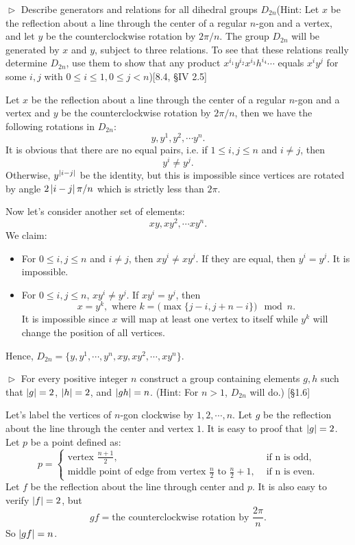 \hypertarget{Exercise II.2.5}{}
\begin{problem}[2.5]
 $\vartriangleright$ Describe generators and relations for all dihedral groups $D_{2n}$(Hint: Let $x$ be the reflection about a line through the 
 center of a regular $n$-gon and a vertex, and let $y$ be the counterclockwise rotation by $2\pi/n$. The group $D_{2n}$ will
 be generated by $x$ and $y$, subject to three relations. To see that these relations really determine $D_{2n}$, use them to show that any product
 $x^{i_1}y^{i_2}x^{i_3}h^{i_4}\cdots$ equals $x^iy^j$ for some $i,j$ with $0\leq i \leq 1, 0\leq j < n$)[8.4, \S IV 2.5]
\end{problem}
\begin{solution}
Let $x$ be the reflection about a line through the center of a regular $n$-gon and a vertex and $y$ be the counterclockwise rotation by $2\pi/n$, then we have the following rotations in $D_{2n}$: $$y, y^1, y^2, \cdots y^{n}.$$
It is obvious that there are no equal pairs, i.e. if $1\leq i,j \leq n$ and $i\neq j$, then $$y^i\neq y^j.$$
Otherwise, $y^{\left|i-j\right|}$ be the identity, but this is impossible since vertices are rotated by angle $2\left|i-j\right|\pi/n$ which is strictly less than $2\pi$. 

\noindent Now let's consider another set of elements:
$$xy, xy^2,\cdots xy^{n}.$$
We claim:
\begin{itemize}
\item For $0\leq i,j \leq n$ and $i\neq j$, then $xy^{i}\neq xy^j$. If they are equal, then $y^i=y^j$. It is impossible.
\item For $0\leq i,j \leq n$, $xy^i\neq y^j$. If $xy^i = y^j$, then $$x=y^k, \text{ where } k = \big(\max\{j-i, j+n-i\}\big)\mod{n}.$$ It is impossible since $x$ will map at least one vertex to itself while $y^k$ will change the position of all vertices.
\end{itemize}

Hence,
$D_{2n} =\{y, y^1,\cdots, y^n, xy, xy^2,\cdots, xy^n\}.$
\end{solution}

\begin{problem}[2.6]
 $\vartriangleright$ For every positive integer $n$ construct a group containing elements $g, h$ such
that $\left|g\right| = 2$, $\left|h\right| = 2$, and $\left|gh\right| = n$. (Hint: For $n > 1$, $D_{2n}$ will do.) [\S 1.6]
\end{problem}
\begin{solution}
Let's label the vertices of $n$-gon clockwise by $1,2,\cdots, n$. 
Let $g$ be the reflection about the line through the center and vertex $1$. It is easy to proof that $\left|g\right| = 2$.
Let $p$ be a point defined as:
$$p=
\begin{cases}
\text{vertex } \frac{n+1}{2}, &\text{ if n is odd},\\
\text {middle point of edge from vertex }\frac{n}{2} \text { to } \frac{n}{2} + 1, &\text{ if n is even}. 
\end{cases}
$$
Let $f$ be the reflection about the line through center and $p$. It is also easy to verify $\left|f\right| = 2$, but 
$$gf = \text{the counterclockwise rotation by }\frac{2\pi}{n}.$$
So $\left|gf\right| = n$. 
\end{solution}


